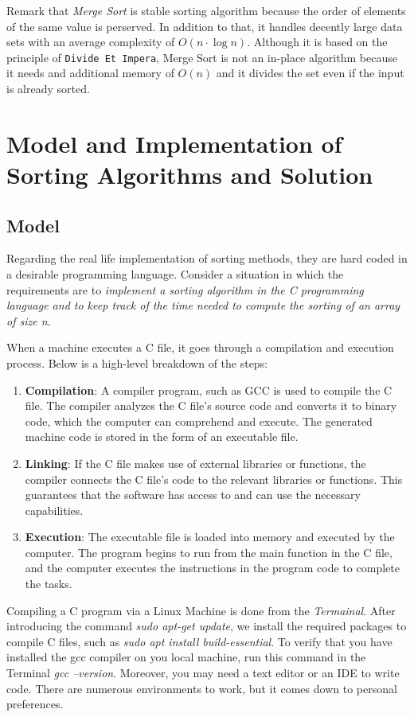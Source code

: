 \documentclass[11pt, letter paper]{article}
\begin{document}
    Remark that \emph{Merge Sort} is stable sorting algorithm because the order of elements of the same value is perserved. In addition to that, it handles decently large data sets with an average complexity of $O(n \cdot \log n)$. Although it is based on the principle of \texttt{Divide Et Impera}, Merge Sort is not an in-place algorithm because it needs and additional memory of $O(n)$ and it divides the set even if the input is already sorted.
    \section{Model and Implementation of Sorting Algorithms and Solution}

    \subsection{Model}
    Regarding the real life implementation of sorting methods, they are hard coded in a desirable programming language. Consider a situation in which the requirements are to \textit{implement a sorting algorithm in the C programming language and to keep track of the time needed to compute the sorting of an array of size n}.

    When a machine executes a C file, it goes through a compilation and execution process. Below is a high-level breakdown of the steps:
    \begin{enumerate}
        \item \textbf{Compilation}:  A compiler program, such as GCC is used to compile the C file. The compiler analyzes the C file's source code and converts it to binary code, which the computer can comprehend and execute. The generated machine code is stored in the form of an executable file.

        \item \textbf{Linking}: If the C file makes use of external libraries or functions, the compiler connects the C file's code to the relevant libraries or functions. This guarantees that the software has access to and can use the necessary capabilities.

        \item \textbf{Execution}: The executable file is loaded into memory and executed by the computer. The program begins to run from the main function in the C file, and the computer executes the instructions in the program code to complete the tasks.
    \end{enumerate}

    Compiling a C program via a Linux Machine is done from the \textit{Termainal}. After introducing the command \emph{sudo apt-get update}, we install the required packages to compile C files, such as \textit{sudo apt install build-essential}. To verify that you have installed the gcc compiler on you local machine, run this command in the Terminal \textit{gcc --version}. Moreover, you may need a text editor or an IDE to write code. There are numerous environments to work, but it comes down to personal preferences.
    
\end{document}
